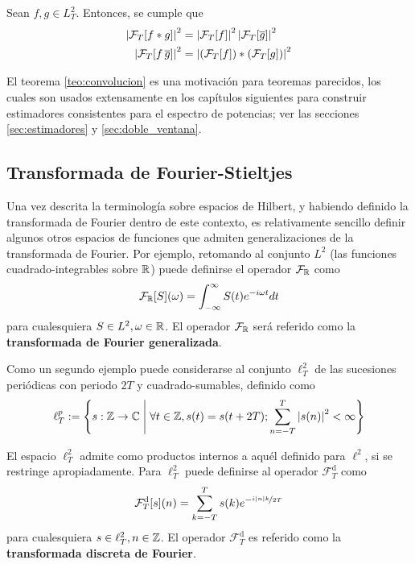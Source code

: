 \begin{corolario}
Sean $f, g \in L^{2}_T$. Entonces, se cumple que
\begin{align}
\left| \mathcal{F}_T[f \ast g] \right|^{2} &= \left|  \mathcal{F}_T[f]  \right|^{2} \left|  \mathcal{F}_T[\overline{g}]  \right|^{2} \\
\left| \mathcal{F}_T[ f\, \overline{g}] \right|^{2} &= \left|  \left( \mathcal{F}_T[f] \right) \ast \left( \mathcal{F}_T[g] \right) \right|^{2}
\end{align}
\label{teo:convolucion}
\end{corolario}

El teorema \ref{teo:convolucion} es una motivación para teoremas parecidos, los cuales son usados extensamente en los capítulos siguientes para construir estimadores consistentes para el espectro de potencias; ver las secciones \ref{sec:estimadores} y \ref{sec:doble_ventana}.


\subsection{Transformada de Fourier-Stieltjes}

Una vez descrita la terminología sobre espacios de Hilbert, y habiendo definido la transformada de Fourier dentro de este contexto, es relativamente sencillo definir algunos otros espacios de funciones que admiten generalizaciones de la transformada de Fourier.
%
Por ejemplo, retomando al conjunto $L^{2}$  (las funciones cuadrado-integrables sobre $\mathbb{R}$) puede definirse el operador $\mathcal{F}_{\mathbb{R}}$ como
\begin{equation}
\mathcal{F}_{\mathbb{R}}[S](\omega) = \int_{-\infty}^{\infty} S(t) e^{-{ i \omega t}} dt
\end{equation}
para cualesquiera $S \in L^{2}, \omega \in \mathbb{R}$. El operador $\mathcal{F}_{\mathbb{R}}$ será referido como la \textbf{transformada de Fourier generalizada}.

Como un segundo ejemplo puede considerarse al conjunto $\ell^{2}_T$ de las sucesiones periódicas con periodo $2T$ y cuadrado-sumables, definido como
\begin{equation}
\ell^{p}_T := \left\{ s: \mathbb{Z}\rightarrow\mathbb{C} \mathrel{}\middle|\mathrel{} \forall t\in \mathbb{Z}, s(t) = s(t+2T) ; \sum_{n=-T}^{T} \left| s(n) \right|^{2} < \infty \right\}
\end{equation}

El espacio $\ell^{2}_T$ admite como productos internos a aquél definido para $\ell^{2}$, si se restringe apropiadamente.
%
Para $\ell^{2}_T$ puede definirse al operador $\mathcal{F}_T^{\text{d}}$ como
\begin{equation}
\mathcal{F}_T^{\text{d}}[s](n) = \sum_{k=-T}^{T} s(k) e^{-\nicefrac{ i \left| n \right| k}{2T}}
\end{equation}
para cualesquiera $s \in \ell^{2}_T, n \in \mathbb{Z}$. El operador $\mathcal{F}_T^{\text{d}}$ es referido como la \textbf{transformada discreta de Fourier}.

